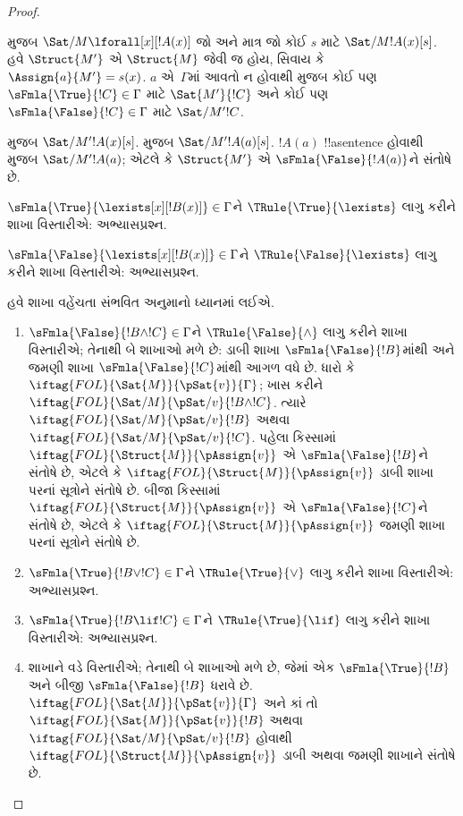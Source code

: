 \documentclass[../../../include/open-logic-section]{subfiles}
\begin{document}
\begin{proof}
\begin{enumerate}
{   મુજબ
  $\Sat/{M}{\lforall[x][!A(x)]}$ જો અને માત્ર જો કોઈ $s$ માટે
  $\Sat/{M}{!A(x)}[s]$. હવે $\Struct{M'}$ એ $\Struct{M}$ જેવી જ હોય,
  સિવાય કે $\Assign{a}{M'} = s(x)$. $a$ એ~$\Gamma$માં આવતો ન હોવાથી
   મુજબ કોઈ પણ
  $\sFmla{\True}{!C} \in \Gamma$ માટે $\Sat{M'}{!C}$ અને કોઈ પણ
  $\sFmla{\False}{!C} \in \Gamma$ માટે $\Sat/{M'}{!C}$.

   મુજબ
  $\Sat/{M'}{!A(x)}[s]$.  મુજબ
  $\Sat/{M'}{!A(a)}[s]$. $!A(a)$ !!a{sentence} હોવાથી
   મુજબ $\Sat/{M'}{!A(a)}$;
  એટલે કે $\Struct{M'}$ એ $\sFmla{\False}{!A(a)}$ને સંતોષે છે.
\item $\sFmla{\True}{\lexists[x][!B(x)]} \in \Gamma$ને
  $\TRule{\True}{\lexists}$ લાગુ કરીને શાખા વિસ્તારીએ: અભ્યાસપ્રશ્ન.
\item $\sFmla{\False}{\lexists[x][!B(x)]} \in \Gamma$ને
  $\TRule{\False}{\lexists}$ લાગુ કરીને શાખા વિસ્તારીએ: અભ્યાસપ્રશ્ન.}{}
\end{enumerate}
હવે શાખા વહેંચતા સંભવિત અનુમાનો ધ્યાનમાં લઈએ.
\begin{enumerate}
\item $\sFmla{\False}{!B \land !C} \in \Gamma$ને
  $\TRule{\False}{\land}$ લાગુ કરીને શાખા વિસ્તારીએ; તેનાથી બે શાખાઓ
  મળે છે: ડાબી શાખા $\sFmla{\False}{!B}$માંથી અને જમણી શાખા
  $\sFmla{\False}{!C}$માંથી આગળ વધે છે. ધારો કે
  $\iftag{FOL}{\Sat{M}}{\pSat{v}}{\Gamma}$; ખાસ કરીને
  $\iftag{FOL}{\Sat/{M}}{\pSat/{v}}{!B \land !C}$. ત્યારે
  $\iftag{FOL}{\Sat/{M}}{\pSat/{v}}{!B}$ અથવા
  $\iftag{FOL}{\Sat/{M}}{\pSat/{v}}{!C}$. પહેલા કિસ્સામાં
  $\iftag{FOL}{\Struct{M}}{\pAssign{v}}$ એ
  $\sFmla{\False}{!B}$ને સંતોષે છે, એટલે કે
  $\iftag{FOL}{\Struct{M}}{\pAssign{v}}$ ડાબી શાખા પરનાં સૂત્રોને
  સંતોષે છે. બીજા કિસ્સામાં $\iftag{FOL}{\Struct{M}}{\pAssign{v}}$ એ
  $\sFmla{\False}{!C}$ને સંતોષે છે, એટલે કે
  $\iftag{FOL}{\Struct{M}}{\pAssign{v}}$ જમણી શાખા પરનાં સૂત્રોને
  સંતોષે છે.
\item $\sFmla{\True}{!B \lor !C} \in \Gamma$ને
  $\TRule{\True}{\lor}$ લાગુ કરીને શાખા વિસ્તારીએ: અભ્યાસપ્રશ્ન.
\item $\sFmla{\True}{!B \lif !C} \in \Gamma$ને
  $\TRule{\True}{\lif}$ લાગુ કરીને શાખા વિસ્તારીએ: અભ્યાસપ્રશ્ન.
\item શાખાને \Cut વડે વિસ્તારીએ; તેનાથી બે શાખાઓ મળે છે, જેમાં એક
  $\sFmla{\True}{!B}$ અને બીજી $\sFmla{\False}{!B}$ ધરાવે છે.
  $\iftag{FOL}{\Sat{M}}{\pSat{v}}{\Gamma}$ અને કાં તો
  $\iftag{FOL}{\Sat{M}}{\pSat{v}}{!B}$ અથવા
  $\iftag{FOL}{\Sat/{M}}{\pSat/{v}}{!B}$ હોવાથી
  $\iftag{FOL}{\Struct{M}}{\pAssign{v}}$ ડાબી અથવા જમણી શાખાને સંતોષે છે.
\end{enumerate}
\end{proof}
\end{document}
